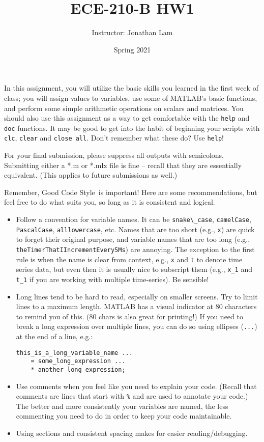\documentclass{article}
\title{ECE-210-B HW1}
\author{Instructor: Jonathan Lam}
\date{Spring 2021}
\begin{document}
	\maketitle
	
	\noindent In this assignment, you will utilize the basic skills you learned in the first week of class; you will assign values to variables, use some of MATLAB's basic functions, and perform some simple arithmetic operations on scalars and matrices. You should also use this assignment as a way to get comfortable with the \lstinline|help| and \lstinline|doc| functions. It may be good to get into the habit of beginning your scripts with \lstinline|clc|, \lstinline|clear| and \lstinline|close all|. Don't remember what these do? Use \lstinline|help|!
	
	For your final submission, please suppress all outputs with semicolons. Submitting either a *.m or *.mlx file is fine -- recall that they are essentially equivalent. (This applies to future submissions as well.)
	
	Remember, Good Code Style\texttrademark\ is important! Here are some recommendations, but feel free to do what suits you, so long as it is consistent and logical.
	\begin{itemize}
		\item Follow a convention for variable names. It can be \lstinline|snake\_case|, \lstinline|camelCase|, \lstinline|PascalCase|, \lstinline|alllowercase|, etc. Names that are too short (e.g., \lstinline|x|) are quick to forget their original purpose, and variable names that are too long (e.g., \lstinline|theTimerThatIIncrementEvery5Ms|) are annoying. The exception to the first rule is when the name is clear from context, e.g., \lstinline|x| and \lstinline|t| to denote time series data, but even then it is usually nice to subscript them (e.g., \lstinline|x_1| and \lstinline|t_1| if you are working with multiple time-series). Be sensible!
		
		\item Long lines tend to be hard to read, especially on smaller screens. Try to limit lines to a maximum length. MATLAB has a visual indicator at 80 characters to remind you of this. (80 chars is also great for printing!) If you need to break a long expression over multiple lines, you can do so using ellipses (\lstinline|...|) at the end of a line, e.g.:
		\begin{lstlisting}[]
this_is_a_long_variable_name ...
	= some_long_expression ...
	* another_long_expression;
		\end{lstlisting}
		
		\item Use comments when you feel like you need to explain your code. (Recall that comments are lines that start with \lstinline|%| and are used to annotate your code.) The better and more consistently your variables are named, the less commenting you need to do in order to keep your code maintainable.
		
		\item Using sections and consistent spacing makes for easier reading/debugging.
	\end{itemize}
	
\end{document}
